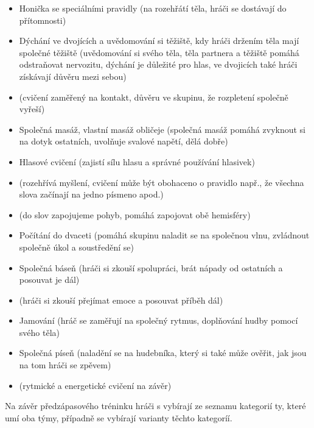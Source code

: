 \documentclass[main.tex]{subfiles}
\begin{document}
\begin{itemize}
\item Honička se speciálními pravidly (na rozehřátí těla, hráči se dostávají do přítomnosti)
\item Dýchání ve dvojících a uvědomování si těžiště, kdy hráči držením těla mají společné těžiště (uvědomování si svého těla, těla partnera a těžiště pomáhá odstraňovat nervozitu, dýchání je důležité pro hlas, ve dvojicích také hráči získávají důvěru mezi sebou)
\item {} (cvičení zaměřený na kontakt, důvěru ve skupinu, že rozpletení společně vyřeší)
\item Společná masáž, vlastní masáž obličeje (společná masáž pomáhá zvyknout si na dotyk ostatních, uvolňuje svalové napětí, dělá dobře)
\item Hlasové cvičení (zajistí sílu hlasu a správné používání hlasivek)
\item {} (rozehřívá myšlení, cvičení může být obohaceno o pravidlo např., že všechna slova začínají na jedno písmeno apod.)
\item {} (do slov zapojujeme pohyb, pomáhá zapojovat obě hemisféry)
\item Počítání do dvaceti (pomáhá skupinu naladit se na společnou vlnu, zvládnout společně úkol a soustředění se)
\item Společná báseň (hráči si zkouší spolupráci, brát nápady od ostatních a posouvat je dál)
\item {} (hráči si zkouší přejímat emoce a posouvat příběh dál)
\item Jamování (hráč se zaměřují na společný rytmus, doplňování hudby pomocí svého těla)
\item Společná píseň (naladění se na hudebníka, který si také může ověřit, jak jsou na tom hráči se zpěvem)
\item {} (rytmické a energetické cvičení na závěr)
\end{itemize}
 
Na závěr předzápasového tréninku hráči s  vybírají ze seznamu kategorií ty, které umí oba týmy, případně se vybírají varianty těchto kategoríí. 
 
 
\end{document}

